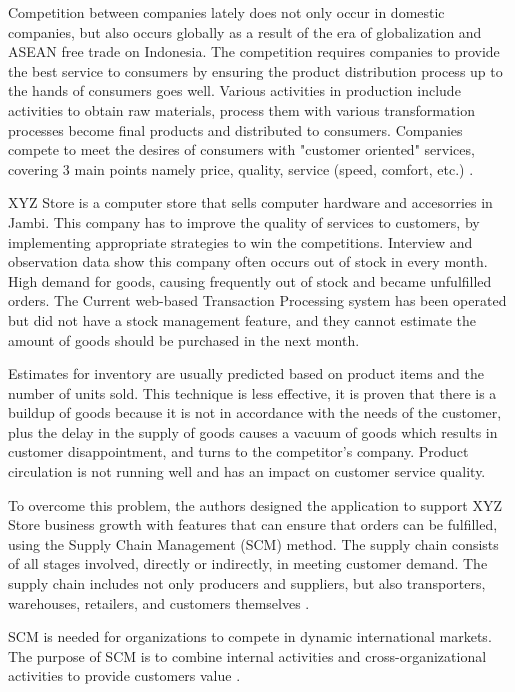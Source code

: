 \documentclass[12pt,a4paper,final]{iopart}
\begin{document}
Competition between companies lately does not only occur in domestic companies, but also occurs globally as a result of the era of globalization and ASEAN free trade on Indonesia. The competition requires companies to provide the best service to consumers by ensuring the product distribution process up to the hands of consumers goes well. Various activities in production include activities to obtain raw materials, process them with various transformation processes become final products and distributed to consumers. Companies compete to meet the desires of consumers with "customer oriented" services, covering 3 main points namely price, quality, service (speed, comfort, etc.) \cite{Indrajit2016a}.

XYZ Store is a computer store that sells computer hardware and accesorries in Jambi. This company has to improve the quality of services to customers, by implementing appropriate strategies to win the competitions. Interview and observation data show this company often occurs out of stock in every month. High demand for goods, causing frequently out of stock and became unfulfilled orders. The Current web-based Transaction Processing system has been operated but did not have a stock management feature, and they cannot estimate the amount of goods should be purchased in the next month.

Estimates for inventory are usually predicted based on product items and the number of units sold. This technique is less effective, it is proven that there is a buildup of goods because it is not in accordance with the needs of the customer, plus the delay in the supply of goods causes a vacuum of goods which results in customer disappointment, and turns to the competitor's company. Product circulation is not running well and has an impact on customer service quality.

To overcome this problem, the authors designed the application to support XYZ Store business growth with features that can ensure that orders can be fulfilled, using the Supply Chain Management (SCM) method. The supply chain consists of all stages involved, directly or indirectly, in meeting customer demand. The supply chain includes not only producers and suppliers, but also transporters, warehouses, retailers, and customers themselves \cite{Sharma2012}.

SCM is needed for organizations to compete in dynamic international markets. The purpose of SCM is to combine internal activities and cross-organizational activities to provide customers value \cite{Habib2019}.
\end{document}
